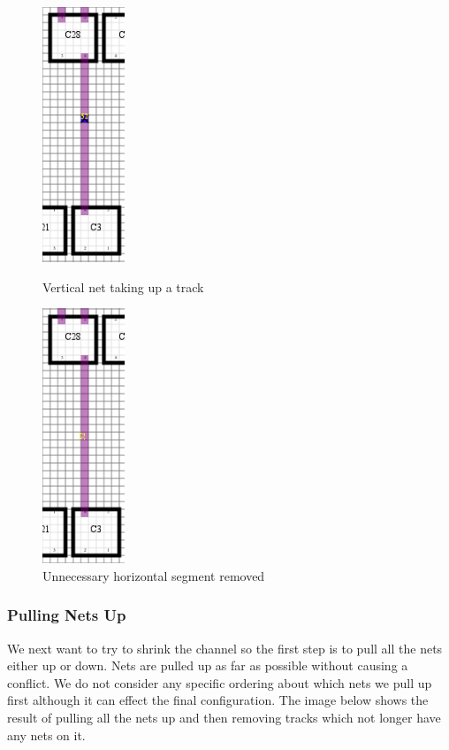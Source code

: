 \documentclass[10pt]{article}
\begin{document}
        \begin{figure}[H]
            \centering
            \begin{minipage}{.5\textwidth}
                \centering
                \includegraphics[height=3in]{./route_2_vertical.png}
                \caption{Vertical net taking up a track}
            \end{minipage}%
            \begin{minipage}{.5\textwidth}
                \centering
                \includegraphics[height=3in]{./route_3_crop.png}
                \caption{Unnecessary horizontal segment removed}
            \end{minipage}
        \end{figure}

    \subsubsection{Pulling Nets Up}

        We next want to try to shrink the channel so the first step is to pull
        all the nets either up or down. Nets are pulled up as far as possible
        without causing a conflict.  We do not consider any specific ordering
        about which nets we pull up first although it can effect the final
        configuration. The image below shows the result of pulling all the nets
        up and then removing tracks which not longer have any nets on it.
\end{document}
